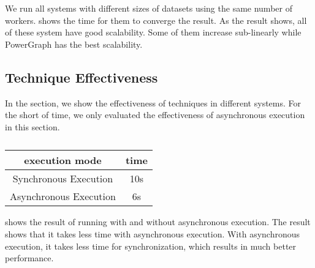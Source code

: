 We run all systems with different sizes of datasets using
the same number of workers.  shows the time
for them to converge the result. As the result shows,
all of these system have good scalability. Some of them increase
sub-linearly while PowerGraph has the best scalability.


\subsection{Technique Effectiveness} \label{subsec:technique}
In the section, we show the effectiveness of techniques in
different systems. For the short of time, we only evaluated
the effectiveness of asynchronous execution in this section.

\begin{table}
  \center
  \begin{tabular}{c|c}
    \hline
    \textbf{execution mode} & \textbf{time} \\
    \hline
    Synchronous Execution & 10s \\
    \hline
    Asynchronous Execution & 6s
  \end{tabular}
  \caption{}
  \label{tab:asyn}

\end{table}

 shows the result of running with and without asynchronous
execution. The result shows that it takes less time with asynchronous
execution. With asynchronous execution, it takes less time for synchronization,
which results in much better performance.

